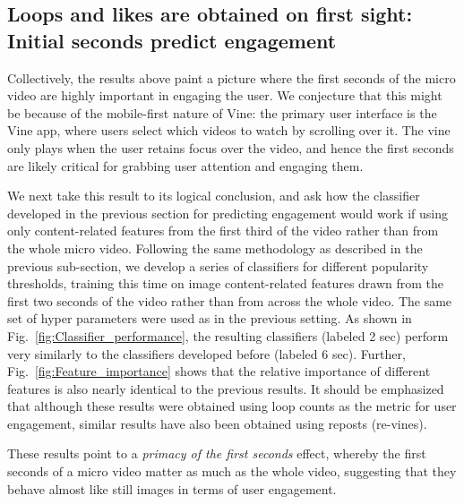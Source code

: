 \subsection{Loops and likes are obtained on first sight: Initial seconds predict engagement}
\label{sec:first-seconds}
Collectively, the results above paint a picture where the first seconds of the micro video are highly important in engaging the user. We conjecture that this might be because of the mobile-first nature of Vine: the primary user interface is the Vine app, where users select which videos to watch by scrolling over it. The vine only plays when the user retains focus over the video, and hence the first seconds are likely critical for grabbing user attention and engaging them. 

We next take this result to its logical conclusion, and ask how the classifier developed in the previous section for predicting engagement would work if using only content-related features from the first third of the video rather than from the whole micro video. Following the same methodology as described in the previous sub-section, we develop a series of classifiers for different popularity thresholds, training this time on image content-related features drawn from the first two seconds of the video rather than from across the whole video. The same set of hyper parameters were used as in the previous setting. As shown in Fig.~\ref{fig:Classifier_performance}, the resulting classifiers (labeled 2 sec) perform very similarly to the classifiers developed before (labeled 6 sec). Further, Fig.~\ref{fig:Feature_importance} shows that the relative importance of different features is also nearly identical to the previous results. It should be emphasized that although these results were obtained using loop counts as the metric for user engagement, similar results have also been obtained using reposts (re-vines). 

These results point to a \emph{primacy of the first seconds} effect, whereby the first seconds of a micro video matter as much as the whole video, suggesting that they behave almost like still images in terms of user engagement.







